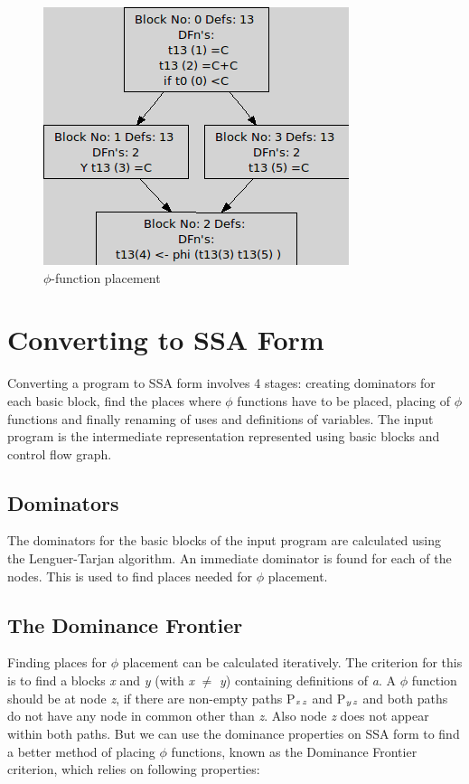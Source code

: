 \documentclass[10pt, oneside, a4paper]{article}
\begin{document}
\begin{figure}[htb]
\begin{center}
\ifpdf
	\includegraphics[scale=0.50]{./ssaExample.png}
\else
\fi
\caption{$\phi$-function placement}
\label{fig:3}
\end{center}
\end{figure}

\section{Converting to SSA Form}
Converting a program to SSA form involves 4 stages: creating dominators for each basic block,  find the places where $\phi$ functions have to be placed, placing of $\phi$ functions and finally renaming of uses and definitions of variables.  The input program is the intermediate representation represented using basic blocks and control flow graph.

\subsection{Dominators}
The dominators for the basic blocks of the input program are calculated using the Lenguer-Tarjan algorithm.  An immediate dominator is found for each of the nodes.  This is used to find places needed for $\phi$ placement.

\subsection{The Dominance Frontier}
Finding places for $\phi$ placement can be calculated iteratively.  The criterion for this is to find a blocks \emph{x} and \emph{y} (with \emph{x} $\neq$ \emph{y}) containing definitions of \emph{a}.  A $\phi$ function should be at node \emph{z}, if there are non-empty paths P$_\emph{x}$$_\emph{z}$ and P$_\emph{y}$$_\emph{z}$ and both paths do not have any node in common other than \emph{z}.  Also node \emph{z} does not appear within both paths.  But we can use the dominance properties on SSA form to find a better method of placing $\phi$ functions, known as the Dominance Frontier criterion, which relies on following properties:
\end{document}
